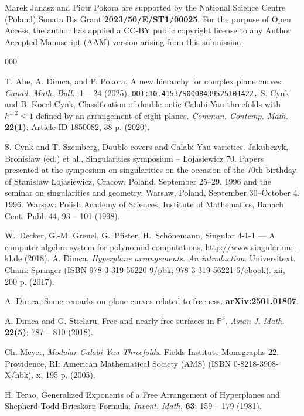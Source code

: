 \documentclass[11pt]{article}
\theoremstyle{plain}
\theoremstyle{definition}
\begin{document}
Marek Janasz and Piotr Pokora are supported by the National Science Centre (Poland) Sonata Bis Grant  \textbf{2023/50/E/ST1/00025}. For the purpose of Open Access, the author has applied a CC-BY public copyright license to any Author Accepted Manuscript (AAM) version arising from this submission.
\begin{thebibliography}{000}


T. Abe, A. Dimca, and P. Pokora, A new hierarchy for complex plane curves. \textit{Canad. Math. Bull.}: 1 -- 24 (2025). \texttt{DOI:10.4153/S0008439525101422.}
S. Cynk and B. Kocel-Cynk, 
Classification of double octic Calabi-Yau threefolds with $h^{1,2}\leq 1$ defined by an arrangement of eight planes. \textit{Commun. Contemp. Math.} \textbf{22(1)}: Article ID 1850082, 38 p. (2020).

S. Cynk and T. Szemberg, Double covers and Calabi-Yau varieties. Jakubczyk, Bronisław (ed.) et al., Singularities symposium – Łojasiewicz 70. Papers presented at the symposium on singularities on the occasion of the 70th birthday of Stanisław Łojasiewicz, Cracow, Poland, September 25–29, 1996 and the seminar on singularities and geometry, Warsaw, Poland, September 30–October 4, 1996. Warsaw: Polish Academy of Sciences, Institute of Mathematics, Banach Cent. Publ. 44, 93 -- 101 (1998).

 W.~Decker, G.-M. Greuel, G.~Pfister, H.~Sch\"onemann, Singular {4-1-1} --- {A} computer algebra system for polynomial computations, \url{http://www.singular.uni-kl.de} (2018).
A. Dimca, \textit{Hyperplane arrangements. An introduction}. Universitext. Cham: Springer (ISBN 978-3-319-56220-9/pbk; 978-3-319-56221-6/ebook). xii, 200 p. (2017).

A. Dimca, Some remarks on plane curves related to freeness. \textbf{arXiv:2501.01807}.

A. Dimca and G. Sticlaru, Free and nearly free surfaces in $\mathbb{P}^{3}$. \textit{Asian J. Math.} \textbf{22(5)}: 787 -- 810 (2018).


Ch. Meyer, \textit{Modular Calabi-Yau Threefolds}. Fields Institute Monographs 22. Providence, RI: American Mathematical Society (AMS) (ISBN 0-8218-3908-X/hbk). x, 195 p. (2005).


H. Terao, Generalized Exponents of a Free Arrangement of Hyperplanes and Shepherd-Todd-Brieskorn Formula. \textit{Invent. Math.} \textbf{63}: 159 -- 179 (1981).

\end{thebibliography}
\end{document}
